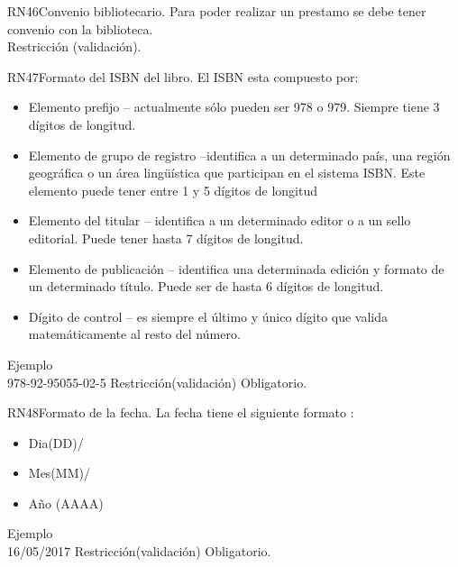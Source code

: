 \begin{BussinesRule}{RN46}{Convenio bibliotecario.} 
	\BRitem[Descripción:] Para poder realizar un prestamo se debe tener convenio con la biblioteca.\\
	\BRitem[Tipo:] Restricción (validación).
\end{BussinesRule}

\begin{BussinesRule}{RN47}{Formato del ISBN del libro.}
	\BRitem[Descripción:] El ISBN esta compuesto por:
		\begin{itemize} 
			\item Elemento prefijo – actualmente sólo pueden ser 978 o 979. Siempre tiene 3 dígitos de longitud.
			\item Elemento de grupo de registro –identifica a un determinado país, una región geográfica o un área lingüística que participan en el sistema ISBN. Este elemento puede tener entre 1 y 5 dígitos de longitud
			\item Elemento del titular – identifica a un determinado editor o a un sello editorial. Puede tener hasta 7 dígitos de longitud. 
			\item Elemento de publicación – identifica una determinada edición y formato de un determinado título. Puede ser de hasta 6 dígitos de longitud. 
			\item Dígito de control – es siempre el último y único dígito que valida matemáticamente al resto del número. 
		\end{itemize}
Ejemplo \\
	978-92-95055-02-5
	\BRitem[Tipo:] Restricción(validación)
	\BRitem[Nivel:] Obligatorio.
\end{BussinesRule}


\begin{BussinesRule}{RN48}{Formato de la fecha.}
	\BRitem[Descripción:] La fecha tiene el siguiente formato :
		\begin{itemize} 
			\item Dia(DD)/ 
			\item Mes(MM)/
			\item Año (AAAA)
		\end{itemize}
Ejemplo \\
	16/05/2017
	\BRitem[Tipo:] Restricción(validación)
	\BRitem[Nivel:] Obligatorio.
\end{BussinesRule}


